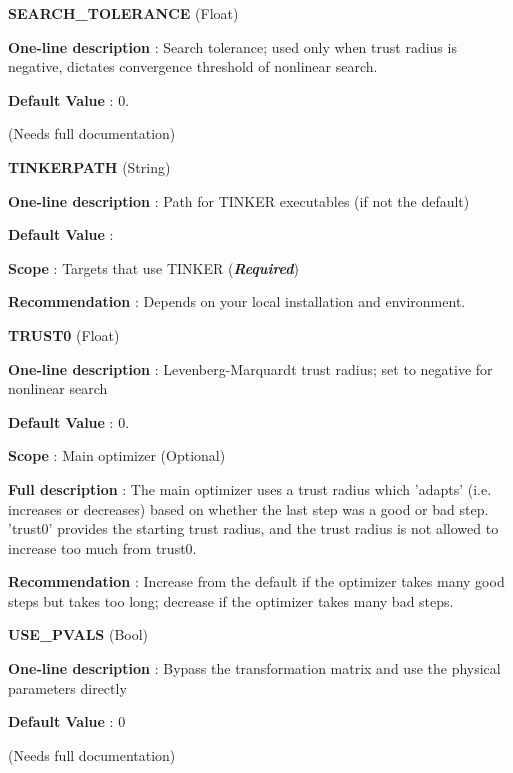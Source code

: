 \begin{DoxyItemize}
\item {\bfseries  \-S\-E\-A\-R\-C\-H\-\_\-\-T\-O\-L\-E\-R\-A\-N\-C\-E } (\-Float) \par
{\bfseries  \-One-\/line description }\-: \-Search tolerance; used only when trust radius is negative, dictates convergence threshold of nonlinear search. \par
{\bfseries  \-Default \-Value }\-: 0. \par
(\-Needs full documentation)\end{DoxyItemize}
\begin{DoxyItemize}
\item {\bfseries  \-T\-I\-N\-K\-E\-R\-P\-A\-T\-H } (\-String) \par
{\bfseries  \-One-\/line description }\-: \-Path for \-T\-I\-N\-K\-E\-R executables (if not the default) \par
{\bfseries  \-Default \-Value }\-: \par
{\bfseries  \-Scope }\-: \-Targets that use \-T\-I\-N\-K\-E\-R ({\bfseries {\itshape \-Required\/}}) \par
{\bfseries  \-Recommendation }\-: \-Depends on your local installation and environment.\end{DoxyItemize}
\begin{DoxyItemize}
\item {\bfseries  \-T\-R\-U\-S\-T0 } (\-Float) \par
{\bfseries  \-One-\/line description }\-: \-Levenberg-\/\-Marquardt trust radius; set to negative for nonlinear search \par
{\bfseries  \-Default \-Value }\-: 0. \par
{\bfseries  \-Scope }\-: \-Main optimizer (\-Optional) \par
{\bfseries  \-Full description }\-: \-The main optimizer uses a trust radius which 'adapts' (i.\-e. increases or decreases) based on whether the last step was a good or bad step. 'trust0' provides the starting trust radius, and the trust radius is not allowed to increase too much from trust0. \par
{\bfseries  \-Recommendation }\-: \-Increase from the default if the optimizer takes many good steps but takes too long; decrease if the optimizer takes many bad steps.\end{DoxyItemize}
\begin{DoxyItemize}
\item {\bfseries  \-U\-S\-E\-\_\-\-P\-V\-A\-L\-S } (\-Bool) \par
{\bfseries  \-One-\/line description }\-: \-Bypass the transformation matrix and use the physical parameters directly \par
{\bfseries  \-Default \-Value }\-: 0 \par
(\-Needs full documentation)\end{DoxyItemize}
